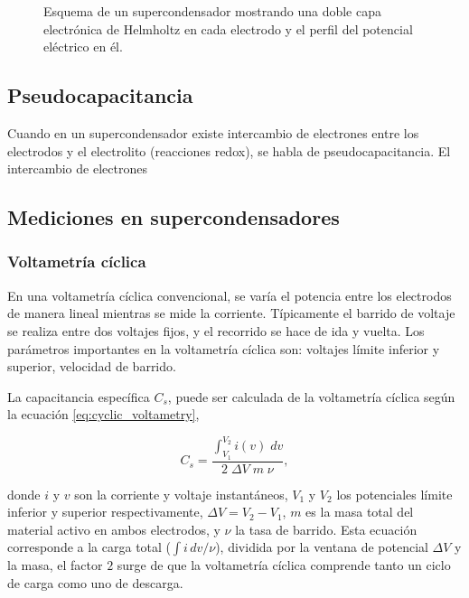 \begin{figure}[h!]
	\centering
	\caption[Esquema de un supercondensador]{Esquema de un supercondensador mostrando una doble capa electrónica de Helmholtz en cada electrodo y el perfil del potencial eléctrico en él.}
	\label{fig:edlc}
\end{figure}

\subsection{Pseudocapacitancia}
Cuando en un supercondensador existe intercambio de electrones entre los electrodos y el electrolito (reacciones redox), se habla de pseudocapacitancia. El intercambio de electrones 


\subsection{Mediciones en supercondensadores}

\subsubsection{Voltametría cíclica}
En una voltametría cíclica convencional, se varía el potencia entre los electrodos de manera lineal mientras se mide la corriente. Típicamente el barrido de voltaje se realiza entre dos voltajes fijos, y el recorrido se hace de ida y vuelta. Los parámetros importantes en la voltametría cíclica son: voltajes límite inferior y superior, velocidad de barrido.

La capacitancia específica $C_s$, puede ser calculada de la voltametría cíclica según la ecuación \ref{eq:cyclic_voltametry},

\begin{equation}\label{eq:cyclic_voltametry}
	C_{s} = \frac{\int_{V_1}^{V_2}i(v) \; dv}{2 \; \Delta V \; m \; \nu },
\end{equation}

donde $i$ y $v$ son la corriente y voltaje instantáneos, $V_1$ y $V_2$ los potenciales límite inferior y superior respectivamente, $\Delta V = V_2 - V_1 $, $m$ es la masa total del material activo en ambos electrodos, y $\nu$ la tasa de barrido. Esta ecuación corresponde a la carga total ($\int i\, dv / \nu$), dividida por la ventana de potencial $\Delta V$ y la masa, el factor $2$ surge de que la voltametría cíclica comprende tanto un ciclo de carga como uno de descarga.

